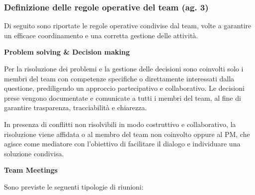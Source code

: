 \documentclass[11pt,a4paper]{article}
\begin{document}
\subsubsection{\texorpdfstring{{Definizione delle regole operative del team (ag. 3)}}{Definizione delle regole operative del team (ag. 3)}}\label{h.a8mv01o13jnj}

{Di seguito sono riportate le regole operative condivise dal team, volte a garantire un efficace coordinamento e una corretta gestione delle attività.}

{}

\medskip\noindent\textbf{Problem solving \& Decision making}\par\smallskip

Per la risoluzione dei problemi e la gestione delle decisioni sono coinvolti solo i membri del team con competenze specifiche o direttamente interessati dalla questione, prediligendo un approccio partecipativo e collaborativo. Le decisioni prese vengono documentate e comunicate a tutti i membri del team, al fine di garantire trasparenza, tracciabilità e chiarezza.

In presenza di conflitti non risolvibili in modo costruttivo e collaborativo, la risoluzione viene affidata o al membro del team non coinvolto oppure al PM, che agisce come mediatore con l’obiettivo di facilitare il dialogo e individuare una soluzione condivisa.

\medskip\noindent\textbf{Team Meetings}\par\smallskip

Sono previste le seguenti tipologie di riunioni:
\end{document}
